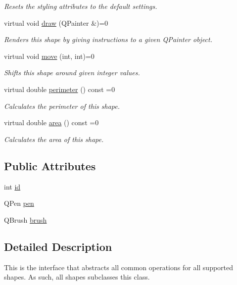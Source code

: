 \begin{DoxyCompactItemize}
\begin{DoxyCompactList}\small\item\em Resets the styling attributes to the default settings. \end{DoxyCompactList}\item 
virtual void \mbox{\hyperlink{class_i_shape_ad97c626e7e2c9afb9f51efc41b836e6f}{draw}} (Q\+Painter \&)=0
\begin{DoxyCompactList}\small\item\em Renders this shape by giving instructions to a given Q\+Painter object. \end{DoxyCompactList}\item 
virtual void \mbox{\hyperlink{class_i_shape_a3d23494cd34e658cc6b39a2e2db0b7fe}{move}} (int, int)=0
\begin{DoxyCompactList}\small\item\em Shifts this shape around given integer values. \end{DoxyCompactList}\item 
virtual double \mbox{\hyperlink{class_i_shape_a485f6770c4e56b31c76d368b959b6f00}{perimeter}} () const =0
\begin{DoxyCompactList}\small\item\em Calculates the perimeter of this shape. \end{DoxyCompactList}\item 
virtual double \mbox{\hyperlink{class_i_shape_aed742a160acdd13c9cfdeb16e605afea}{area}} () const =0
\begin{DoxyCompactList}\small\item\em Calculates the area of this shape. \end{DoxyCompactList}\end{DoxyCompactItemize}
\subsection*{Public Attributes}
\begin{DoxyCompactItemize}
\item 
int \mbox{\hyperlink{class_i_shape_a6ff2d631831c1079b88eeebc8ac65bb0}{id}}
\item 
Q\+Pen \mbox{\hyperlink{class_i_shape_ab185a01c9703b4db801b54030031a9c6}{pen}}
\item 
Q\+Brush \mbox{\hyperlink{class_i_shape_a3827e9f0c3c88331ceaa3bb9b00f7073}{brush}}
\end{DoxyCompactItemize}


\subsection{Detailed Description}
This is the interface that abstracts all common operations for all supported shapes. As such, all shapes subclasses this class. 




